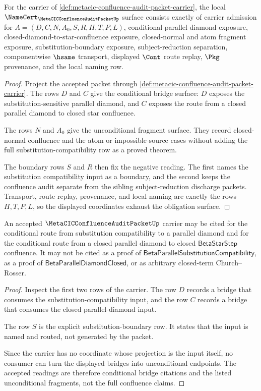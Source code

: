 \begin{theorem}
\label{thm:metacic-confluence-audit-packet-namecert-obligations}
For the carrier of \autoref{def:metacic-confluence-audit-packet-carrier}, the
local $\NameCert_{\MetaCICConfluenceAuditPacketUp}$ surface consists exactly of
carrier admission for $A=(D,C,N,A_0,S,R,H,T,P,L)$, conditional parallel-diamond
exposure, closed-diamond-to-star-confluence exposure, closed-normal and atom
fragment exposure, substitution-boundary exposure, subject-reduction separation,
componentwise $\hsame$ transport, displayed $\Cont$ route replay, $\Pkg$
provenance, and the local naming row.
\end{theorem}
\begin{proof}
Project the accepted packet through
\autoref{def:metacic-confluence-audit-packet-carrier}. The rows $D$ and $C$
give the conditional bridge surface: $D$ exposes the substitution-sensitive
parallel diamond, and $C$ exposes the route from a closed parallel diamond to
closed star confluence.

The rows $N$ and $A_0$ give the unconditional fragment surface. They record
closed-normal confluence and the atom or impossible-source cases without adding
the full substitution-compatibility row as a proved theorem.

The boundary rows $S$ and $R$ then fix the negative reading. The first names the
substitution compatibility input as a boundary, and the second keeps the
confluence audit separate from the sibling subject-reduction discharge packets.
Transport, route replay, provenance, and local naming are exactly the rows
$H,T,P,L$, so the displayed coordinates exhaust the obligation surface.
\end{proof}

\begin{theorem}
\label{thm:metacic-confluence-audit-packet-conditional-boundary}
An accepted $\MetaCICConfluenceAuditPacketUp$ carrier may be cited for the
conditional route from substitution compatibility to a parallel diamond and for
the conditional route from a closed parallel diamond to closed
$\mathsf{BetaStarStep}$ confluence. It may not be cited as a proof of
$\mathsf{BetaParallelSubstitutionCompatibility}$, as a proof of
$\mathsf{BetaParallelDiamondClosed}$, or as arbitrary closed-term
Church--Rosser.
\end{theorem}
\begin{proof}
Inspect the first two rows of the carrier. The row $D$ records a bridge that
consumes the substitution-compatibility input, and the row $C$ records a bridge
that consumes the closed parallel-diamond input.

The row $S$ is the explicit substitution-boundary row. It states that the input
is named and routed, not generated by the packet.

Since the carrier has no coordinate whose projection is the input itself, no
consumer can turn the displayed bridges into unconditional endpoints. The
accepted readings are therefore conditional bridge citations and the listed
unconditional fragments, not the full confluence claims.
\end{proof}

